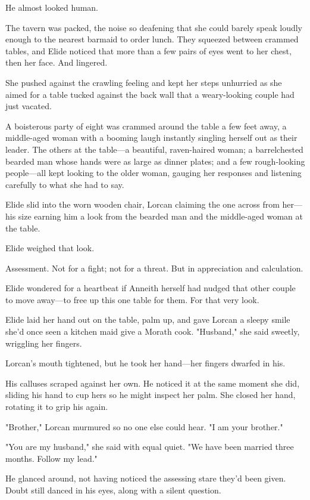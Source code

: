 He almost looked human.

The tavern was packed, the noise so deafening that she could barely speak loudly enough to the nearest barmaid to order lunch.
They squeezed between crammed tables, and Elide noticed that more than a few pairs of eyes went to her chest, then her face.
And lingered.

She pushed against the crawling feeling and kept her steps unhurried as she aimed for a table tucked against the back wall that a weary-looking couple had just vacated.

A boisterous party of eight was crammed around the table a few feet away, a middle-aged woman with a booming laugh instantly singling herself out as their leader.
The others at the table---a beautiful, raven-haired woman; a barrelchested bearded man whose hands were as large as dinner plates; and a few rough-looking people---all kept looking to the older woman, gauging her responses and listening carefully to what she had to say.

Elide slid into the worn wooden chair, Lorcan claiming the one across from her---his size earning him a look from the bearded man and the middle-aged woman at the table.

Elide weighed that look.

Assessment.
Not for a fight; not for a threat.
But in appreciation and calculation.

Elide wondered for a heartbeat if Anneith herself had nudged that other couple to move away---to free up this one table for them.
For that very look.

Elide laid her hand out on the table, palm up, and gave Lorcan a sleepy smile she'd once seen a kitchen maid give a Morath cook.
"Husband," she said sweetly, wriggling her fingers.

Lorcan's mouth tightened, but he took her hand---her fingers dwarfed in his.

His calluses scraped against her own.
He noticed it at the same moment she did, sliding his hand to cup hers so he might inspect her palm.
She closed her hand, rotating it to grip his again.

"Brother," Lorcan murmured so no one else could hear.
"I am your brother."

"You are my husband," she said with equal quiet.
"We have been married three months.
Follow my lead."

He glanced around, not having noticed the assessing stare they'd been given.
Doubt still danced in his eyes, along with a silent question.

